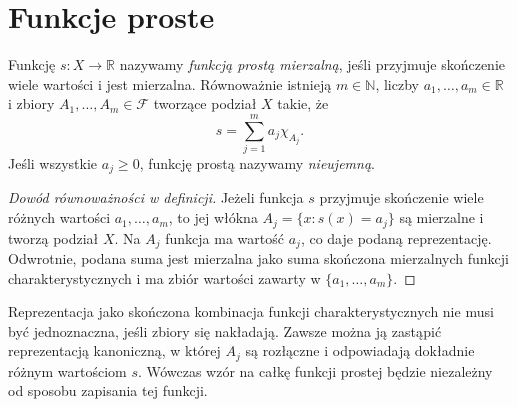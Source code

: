 \section{Funkcje proste}

\begin{definicja}
\label{def:simple-function}
Funkcję $s:X\to\mathbb R$ nazywamy
\emph{funkcją prostą mierzalną}, jeśli przyjmuje
skończenie wiele wartości i jest mierzalna.
Równoważnie istnieją $m\in\mathbb N$,
liczby $a_1,\ldots,a_m\in\mathbb R$ i zbiory
$A_1,\ldots,A_m\in\mathcal F$ tworzące podział $X$
takie, że
\[
s=\sum_{j=1}^m a_j\chi_{A_j}.
\]
Jeśli wszystkie $a_j\ge0$, funkcję prostą nazywamy
\emph{nieujemną}.
\end{definicja}

\begin{proof}[Dowód równoważności w definicji]
Jeżeli funkcja $s$ przyjmuje skończenie wiele różnych
wartości $a_1,\ldots,a_m$, to jej włókna
$A_j=\{x:s(x)=a_j\}$ są mierzalne i tworzą
podział $X$. Na $A_j$ funkcja ma wartość $a_j$,
co daje podaną reprezentację. Odwrotnie, podana suma
jest mierzalna jako suma skończona mierzalnych funkcji
charakterystycznych i ma zbiór wartości zawarty w
$\{a_1,\ldots,a_m\}$.
\end{proof}

\begin{uwaga}
Reprezentacja jako skończona kombinacja funkcji
charakterystycznych nie musi być jednoznaczna, jeśli
zbiory się nakładają. Zawsze można ją zastąpić
reprezentacją kanoniczną, w której $A_j$ są rozłączne
i odpowiadają dokładnie różnym wartościom $s$.
Wówczas wzór na całkę funkcji prostej będzie
niezależny od sposobu zapisania tej funkcji.
\end{uwaga}


